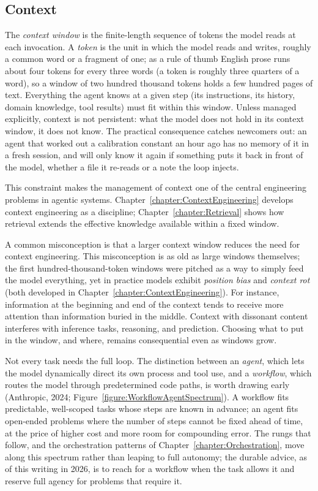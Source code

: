 \subsection{Context}

The \emph{context window} is the finite-length sequence of tokens the model reads at each invocation.
A \emph{token} is the unit in which the model reads and writes, roughly a common word or a fragment of one; as a rule of thumb English prose runs about four tokens for every three words (a token is roughly three quarters of a word), so a window of two hundred thousand tokens holds a few hundred pages of text.
Everything the agent knows at a given step (its instructions, its history, domain knowledge, tool results) must fit within this window.
Unless managed explicitly, context is not persistent: what the model does not hold in its context window, it does not know.
The practical consequence catches newcomers out: an agent that worked out a calibration constant an hour ago has no memory of it in a fresh session, and will only know it again if something puts it back in front of the model, whether a file it re-reads or a note the loop injects.

This constraint makes the management of context one of the central engineering problems in agentic systems.
Chapter~\ref{chapter:ContextEngineering} develops context engineering as a discipline; Chapter~\ref{chapter:Retrieval} shows how retrieval extends the effective knowledge available within a fixed window.

\begin{remark}
A common misconception is that a larger context window reduces the need for context engineering.
This misconception is as old as large windows themselves; the first hundred-thousand-token windows were pitched as a way to simply feed the model everything, yet in practice models exhibit \emph{position bias} and \emph{context rot} (both developed in Chapter~\ref{chapter:ContextEngineering}).
For instance, information at the beginning and end of the context tends to receive more attention than information buried in the middle.
Context with dissonant content interferes with inference tasks, reasoning, and prediction.
Choosing what to put in the window, and where, remains consequential even as windows grow.
\end{remark}

Not every task needs the full loop.
The distinction between an \emph{agent}, which lets the model dynamically direct its own process and tool use, and a \emph{workflow}, which routes the model through predetermined code paths, is worth drawing early (Anthropic, 2024; Figure~\ref{figure:WorkflowAgentSpectrum}).
A workflow fits predictable, well-scoped tasks whose steps are known in advance; an agent fits open-ended problems where the number of steps cannot be fixed ahead of time, at the price of higher cost and more room for compounding error.
The rungs that follow, and the orchestration patterns of Chapter~\ref{chapter:Orchestration}, move along this spectrum rather than leaping to full autonomy; the durable advice, as of this writing in 2026, is to reach for a workflow when the task allows it and reserve full agency for problems that require it.


